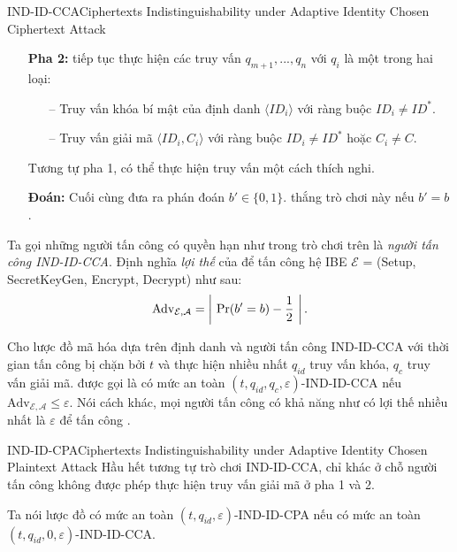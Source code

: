 \documentclass[class=report, crop=false]{standalone}
\begin{document}
\begin{game}{IND-ID-CCA}{Ciphertexts Indistinguishability under Adaptive Identity Chosen Ciphertext Attack}
\begin{itemize}[leftmargin=1.5cm, itemindent=-0.5cm]
					\item[] \textbf{Pha 2:} \adversary tiếp tục thực hiện các truy vấn $q_{m + 1}, ..., q_{n}$ với $q_i$ là một trong hai loại:
					\begin{itemize}
						\item[--] Truy vấn khóa bí mật của định danh $\langle ID_i \rangle$ với ràng buộc $ID_i \neq ID^*$.
						\item[--] Truy vấn giải mã $\langle ID_i, C_i \rangle$ với ràng buộc $ID_i \neq ID^*$ hoặc $C_i \neq C$.
					\end{itemize}
					Tương tự pha 1, \adversary có thể thực hiện truy vấn một cách thích nghi.
					\item[] \textbf{Đoán:} Cuối cùng \adversary đưa ra phán đoán $b' \in \{0, 1\}$. \adversary thắng trò chơi này nếu $b' = b$.
				\end{itemize}
				\vspace{-\baselineskip}\par
				Ta gọi những người tấn công có quyền hạn như \adversary trong trò chơi trên là \textit{người tấn công IND-ID-CCA}. Định nghĩa \textit{lợi thế} của \adversary để tấn công hệ IBE $\mathcal{E}$ = (\textsf{Setup, SecretKeyGen, Encrypt, Decrypt}) như sau:
				\[
					\text{Adv}_{\mathcal{E, A}} = \left| \ \text{Pr}(b' = b) - \frac{1}{2} \ \right|.
				\]
			\end{game}
			\begin{definition}\label{def:cca}
				Cho lược đồ mã hóa dựa trên định danh \scheme và người tấn công IND-ID-CCA \adversary với thời gian tấn công bị chặn bởi $t$ và thực hiện nhiều nhất $q_{id}$ truy vấn khóa, $q_c$ truy vấn giải mã. \scheme được gọi là có mức an toàn $(t, q_{id}, q_c, \varepsilon)$-IND-ID-CCA nếu $\text{Adv}_{\mathcal{E, A}} \leq \varepsilon$. Nói cách khác, mọi người tấn công có khả năng như \adversary có lợi thế nhiều nhất là $\varepsilon$ để tấn công \scheme.
			\end{definition}
			\begin{game}{IND-ID-CPA}{Ciphertexts Indistinguishability under Adaptive Identity Chosen Plaintext Attack}
				Hầu hết tương tự trò chơi IND-ID-CCA, chỉ khác ở chỗ người tấn công không được phép thực hiện truy vấn giải mã ở pha 1 và 2.
			\end{game}
			\begin{definition}\label{def:cpa}
				Ta nói lược đồ \scheme có mức an toàn $(t, q_{id}, \varepsilon)$-IND-ID-CPA nếu \scheme có mức an toàn $(t, q_{id}, 0, \varepsilon)$-IND-ID-CCA.
			\end{definition}
\end{document}
